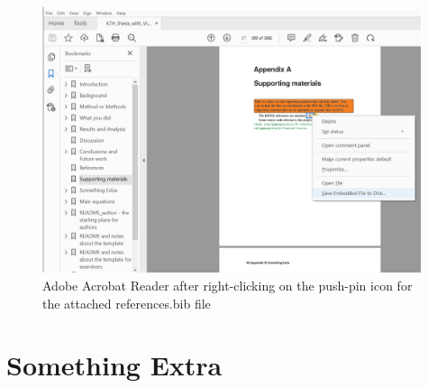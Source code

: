 \documentclass[nomenclature, english, bibtex]{kththesis}
\begin{document}
\begin{figure}[!ht]
  \begin{center}
    \includegraphics[width=0.99\textwidth]{README_notes/Bib-save-embedded-example.png}
  \end{center}
  \caption{Adobe Acrobat Reader after right-clicking on the push-pin icon for the attached references.bib file}
  \label{fig:PDFreaderPushpinExample}
\end{figure}
\FloatBarrier
\cleardoublepage

\chapter{Something Extra}
\end{document}
